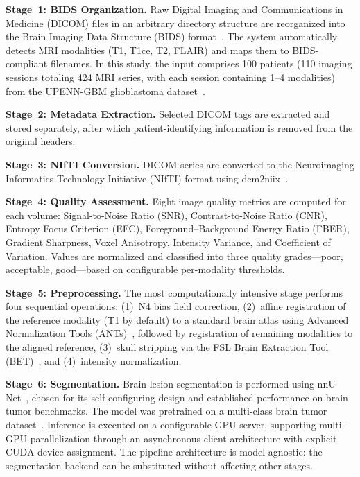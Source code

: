 \documentclass[conference]{IEEEtran}
\begin{document}
\textbf{Stage~1: BIDS Organization.} Raw Digital Imaging and Communications in Medicine (DICOM) files in an arbitrary directory structure are reorganized into the Brain Imaging Data Structure (BIDS) format~\cite{gorgolewski2016}. The system automatically detects MRI modalities (T1, T1ce, T2, FLAIR) and maps them to BIDS-compliant filenames. In this study, the input comprises 100 patients (110 imaging sessions totaling 424 MRI series, with each session containing 1--4 modalities) from the UPENN-GBM glioblastoma dataset~\cite{bakas2022}.

\textbf{Stage~2: Metadata Extraction.} Selected DICOM tags are extracted and stored separately, after which patient-identifying information is removed from the original headers.

\textbf{Stage~3: NIfTI Conversion.} DICOM series are converted to the Neuroimaging Informatics Technology Initiative (NIfTI) format using dcm2niix~\cite{li2016}.

\textbf{Stage~4: Quality Assessment.} Eight image quality metrics are computed for each volume: Signal-to-Noise Ratio (SNR), Contrast-to-Noise Ratio (CNR), Entropy Focus Criterion (EFC), Foreground--Background Energy Ratio (FBER), Gradient Sharpness, Voxel Anisotropy, Intensity Variance, and Coefficient of Variation. Values are normalized and classified into three quality grades---poor, acceptable, good---based on configurable per-modality thresholds.

\textbf{Stage~5: Preprocessing.} The most computationally intensive stage performs four sequential operations: (1)~N4 bias field correction, (2)~affine registration of the reference modality (T1 by default) to a standard brain atlas using Advanced Normalization Tools (ANTs)~\cite{avants2009}, followed by registration of remaining modalities to the aligned reference, (3)~skull stripping via the FSL Brain Extraction Tool (BET)~\cite{smith2002}, and (4)~intensity normalization.

\textbf{Stage~6: Segmentation.} Brain lesion segmentation is performed using nnU-Net~\cite{isensee2021}, chosen for its self-configuring design and established performance on brain tumor benchmarks. The model was pretrained on a multi-class brain tumor dataset~\cite{pnev2022}. Inference is executed on a configurable GPU server, supporting multi-GPU parallelization through an asynchronous client architecture with explicit CUDA device assignment. The pipeline architecture is model-agnostic: the segmentation backend can be substituted without affecting other stages.
\end{document}
